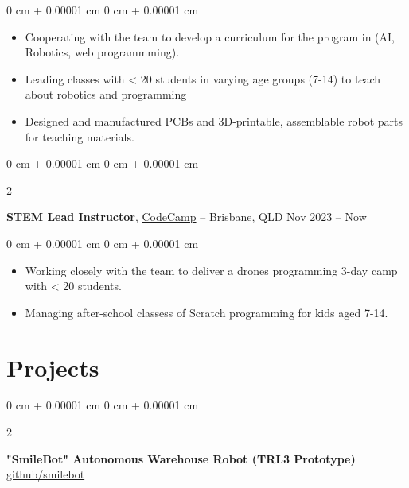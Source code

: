 \documentclass[10pt, letterpaper]{article}
\newenvironment{highlights}{
    \begin{itemize}[
        topsep=0.10 cm,
        parsep=0.10 cm,
        partopsep=0pt,
        itemsep=0pt,
        leftmargin=0 cm + 10pt
    ]
}{
    \end{itemize}
} %
\newenvironment{onecolentry}{
    \begin{adjustwidth}{
        0 cm + 0.00001 cm
    }{
        0 cm + 0.00001 cm
    }
}{
    \end{adjustwidth}
} %
\newenvironment{twocolentry}[2][]{
    \onecolentry
    \def\secondColumn{#2}
    \setcolumnwidth{\fill, 4.5 cm}
    \begin{paracol}{2}
}{
    \switchcolumn \raggedleft \secondColumn
    \end{paracol}
    \endonecolentry
} %
\begin{document}
\vspace{0.10 cm}
\begin{onecolentry}
      \begin{highlights}
            \item Cooperating with the team to develop a curriculum for the program in (AI,
            Robotics, web programmming).
            \item Leading classes with < 20 students in varying age groups (7-14) to teach about
            robotics and programming
            \item Designed and manufactured PCBs and 3D-printable, assemblable robot parts for
            teaching materials.
      \end{highlights}
\end{onecolentry}

\vspace{0.4 cm}

\begin{twocolentry}{
            Nov 2023 – Now
      }
      \textbf{STEM Lead Instructor}, \href{https://www.codecamp.com.au/}{CodeCamp} -- Brisbane, QLD\end{twocolentry}

\vspace{0.10 cm}
\begin{onecolentry}
      \begin{highlights}
            \item Working closely with the team to deliver a drones programming 3-day camp with <
            20 students.
            \item Managing after-school classess of Scratch programming for kids aged 7-14.

      \end{highlights}
\end{onecolentry}

\section{Projects}

\begin{twocolentry}{
            \href{https://github.com/bocho0600/smilebot}{github/smilebot}
      }
      \textbf{"SmileBot" Autonomous Warehouse Robot (TRL3 Prototype)}\end{twocolentry}
\end{document}
